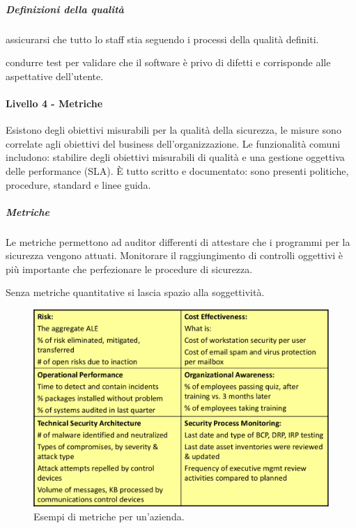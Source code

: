 \subparagraph{Definizioni della qualità}

 assicurarsi che tutto lo staff stia 
seguendo i processi della qualità definiti.

 condurre test per validare che il 
software è privo di difetti e corrisponde alle aspettative dell'utente.

\paragraph{Livello 4 - Metriche}

Esistono degli obiettivi misurabili per la qualità della sicurezza, le misure 
sono correlate agli obiettivi del business dell'organizzazione. Le 
funzionalità comuni includono: stabilire degli obiettivi misurabili di qualità 
e una gestione oggettiva delle performance (SLA).
È tutto scritto e documentato: sono presenti politiche, 
procedure, standard e linee guida.

\subparagraph{Metriche}

Le metriche permettono ad auditor differenti di attestare che i programmi per 
la sicurezza vengono attuati. Monitorare il raggiungimento di controlli 
oggettivi è più importante che perfezionare le procedure di sicurezza.

Senza metriche quantitative si lascia spazio alla soggettività.

\begin{figure}[h!]
        \begin{center}
                \includegraphics[scale=1.5]{res/img/metriche}
        \end{center}
        \caption{Esempi di metriche per un'azienda.}    
\end{figure}

